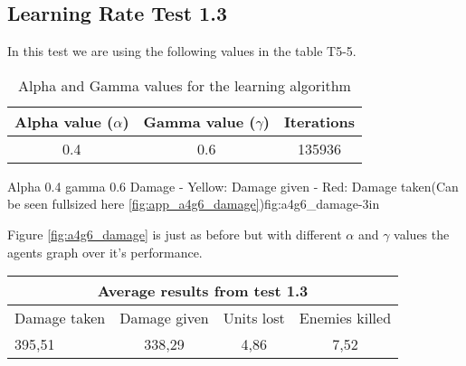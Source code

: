 
\subsection*{Learning Rate Test 1.3}
In this test we are using the following values in the table T5-5.

\begin{centering}
\begin{table}[H]
 \begin{tabular}{|c|c|c|}
	\hline
		Alpha value ($\alpha$) & Gamma value ($\gamma$) & Iterations\\
	\hline
		0.4 & 0.6 & 135936 \\
	\hline
\end{tabular}
\label{a4g6_table}
\caption{Alpha and Gamma values for the learning algorithm}
\end{table}
\end{centering}

			{Alpha 0.4 gamma 0.6 Damage - Yellow: Damage given - Red: Damage taken(Can be seen fullsized here \ref{fig:app_a4g6_damage})}{fig:a4g6_damage}{-3in}

Figure \ref{fig:a4g6_damage} is just as before but with different $\alpha$ and $\gamma$ values the agents graph over it's performance.




\begin{centering}
 \begin{tabular}{|l|c|c|c|}
	\multicolumn{4}{c}{Average results from test 1.3} \\
	\hline
		Damage taken & Damage given & Units lost & Enemies killed\\
	\hline
		395,51 & 338,29 & 4,86 & 7,52 \\
	\hline
\end{tabular}
\label{test1.3}
\end{centering}
\newpage

